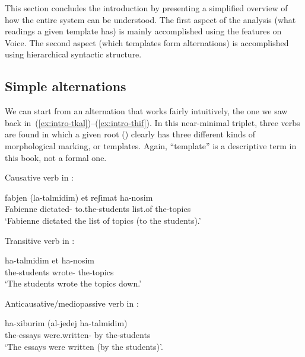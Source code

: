 \begin{exe}
\begin{xlist}
\begin{exe}
\begin{exe}
\begin{exe}
\begin{exe}
\begin{xlist}
\begin{exe}
\begin{xlist}
\begin{xlist}
\begin{xlist}
\begin{exe}
\begin{xlist}
\begin{exe}
\begin{exe}
\begin{exe}
\begin{exe}
\begin{xlist}
\begin{exe}
\begin{xlist}
\begin{exe}
\begin{exe}
\begin{xlist}
\begin{exe}
\begin{xlist}
\begin{exe}
\begin{xlist}
\begin{exe}
\begin{exe}
\begin{xlist}
\begin{exe}
\begin{exe}
\begin{xlist}
\begin{exe}
\begin{exe}
\begin{xlist}
\begin{exe}
\begin{exe}
\begin{xlist}
\begin{exe}
\begin{xlist}
\begin{exe}
\begin{exe}
\begin{exe}
This section concludes the introduction by presenting a simplified overview of how the entire system can be understood. The first aspect of the analysis (what readings a given template has) is mainly accomplished using the features on Voice. The second aspect (which templates form alternations) is accomplished using hierarchical syntactic structure.

	\subsection{Simple alternations}
We can start from an alternation that works fairly intuitively, the one we saw back in~(\ref{ex:intro-tkal})--(\ref{ex:intro-thif}). In this near-minimal triplet, three verbs are found in which a given root () clearly has three different kinds of morphological marking, or templates. Again, ``template'' is a descriptive term in this book, not a formal one.

 \begin{exe}
 \ex \label{ex:general} 
 \begin{xlist} 
 	\ex  Causative verb in {\thif}: 
		
 		\gll  fabjen  (la-talmidim) et reʃimat ha-nosim\\
 		  Fabienne dictated- to.the-students  list.of the-topics\\
 		\glt `Fabienne dictated the list of topics (to the students).' 
		
 	\ex  Transitive verb in {\tkal}: 
		
 		\gll  ha-talmidim  et ha-nosim\\
 		  the-students wrote-  the-topics\\
 		\glt `The students wrote the topics down.' 
	
 	\ex  Anticausative/mediopassive verb in {\tnif}: 
		
 		\gll  ha-xiburim  (al-jedej ha-talmidim)\\
 		  the-essays were.written- by the-students\\
 		\glt `The essays were written (by the students)'. 
	
 \z
\z 


\end{xlist}
\end{exe}
\end{exe}
\end{exe}
\end{exe}
\end{xlist}
\end{exe}
\end{xlist}
\end{exe}
\end{exe}
\end{xlist}
\end{exe}
\end{exe}
\end{xlist}
\end{exe}
\end{exe}
\end{xlist}
\end{exe}
\end{exe}
\end{xlist}
\end{exe}
\end{xlist}
\end{exe}
\end{xlist}
\end{exe}
\end{exe}
\end{xlist}
\end{exe}
\end{xlist}
\end{exe}
\end{exe}
\end{exe}
\end{exe}
\end{xlist}
\end{exe}
\end{xlist}
\end{xlist}
\end{xlist}
\end{exe}
\end{xlist}
\end{exe}
\end{exe}
\end{exe}
\end{exe}
\end{xlist}
\end{exe}
